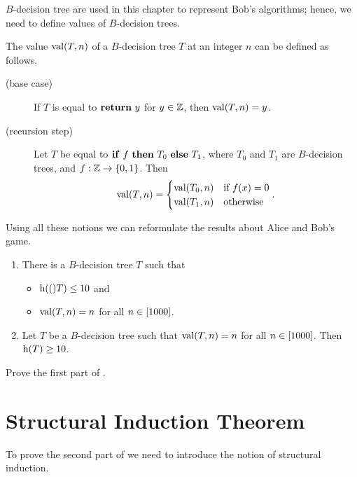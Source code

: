 $B$-decision tree are used in this chapter to represent Bob's algorithms;
hence, we need to define values of $B$-decision trees.
\begin{definition}
  The value $\mathrm{val}({T}, {n})$ of a $B$-decision tree $T$ at an integer $n$
  can be defined as follows.
  \begin{description}
      \item [(base case)] If $T$ is equal to $\mathbf{return}~{y}$ for $y \in {\mathbb{Z}}$,
        then $\mathrm{val}({T}, {n}) = y$.
      \item[(recursion step)] Let $T$ be equal to $\mathbf{if}~{f}~\mathbf{then}~{T_0}~\mathbf{else}~{T_1}$, where
        $T_0$ and $T_1$ are $B$-decision trees, and $f : \Z \to \set{0, 1}$.
        Then
        \[
          \mathrm{val}({T}, {n}) =
          \begin{cases}
            \mathrm{val}(T_0, n) & \text{if } f(x) = 0 \\
            \mathrm{val}(T_1, n) & \text{otherwise}
          \end{cases}.
        \]
  \end{description}
\end{definition}

Using all these notions we can reformulate the results about Alice and Bob's
game.
\begin{theorem}
\label{theorem:guess-the-number}
  \begin{enumerate}
    \item There is a $B$-decision tree $T$ such that
      \begin{itemize}
        \item $\DTHeight(T) \le 10$ and
        \item $\mathrm{val}({T}, {n}) = n$ for all $n \in {[{1000}]}$.
      \end{itemize}
    \item Let $T$ be a $B$-decision tree such that $\mathrm{val}({T}, {n}) = n$ for
      all $n \in {[{1000}]}$. Then $\DTHeight{T} \ge 10$.
  \end{enumerate}
\end{theorem}

\begin{exercise}
  Prove the first part of .
\end{exercise}

\section{Structural Induction Theorem}
To prove the second part of  we need
to introduce the notion of structural induction.


